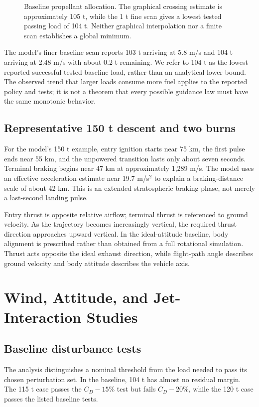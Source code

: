 \documentclass[11pt,a4paper]{article}
\begin{document}
\begin{figure}[htbp]
\centering\SourceFuelPlot
\caption{Baseline propellant allocation. The graphical crossing estimate is approximately 105 t, while the 1 t fine scan gives a lowest tested passing load of 104 t. Neither graphical interpolation nor a finite scan establishes a global minimum.}
\label{fig:fuel}
\end{figure}

The model's finer baseline scan reports 103 t arriving at 5.8 m/s and 104 t arriving at 2.48 m/s with about 0.2 t remaining. We refer to 104 t as the lowest reported successful tested baseline load, rather than an analytical lower bound. The observed trend that larger loads consume more fuel applies to the reported policy and tests; it is not a theorem that every possible guidance law must have the same monotonic behavior.

\subsection{Representative 150 t descent and two burns}


For the model's 150 t example, entry ignition starts near 75 km, the first pulse ends near 55 km, and the unpowered transition lasts only about seven seconds. Terminal braking begins near 47 km at approximately 1,289 m/s. The model uses an effective acceleration estimate near 19.7 m/s$^2$ to explain a braking-distance scale of about 42 km. This is an extended stratospheric braking phase, not merely a last-second landing pulse.




Entry thrust is opposite relative airflow; terminal thrust is referenced to ground velocity. As the trajectory becomes increasingly vertical, the required thrust direction approaches upward vertical. In the ideal-attitude baseline, body alignment is prescribed rather than obtained from a full rotational simulation. Thrust acts opposite the ideal exhaust direction, while flight-path angle describes ground velocity and body attitude describes the vehicle axis.

\section{Wind, Attitude, and Jet-Interaction Studies}
\subsection{Baseline disturbance tests}
The analysis distinguishes a nominal threshold from the load needed to pass its chosen perturbation set. In the baseline, 104 t has almost no residual margin. The 115 t case passes the $C_D-15\%$ test but fails $C_D-20\%$, while the 120 t case passes the listed baseline tests.
\end{document}

